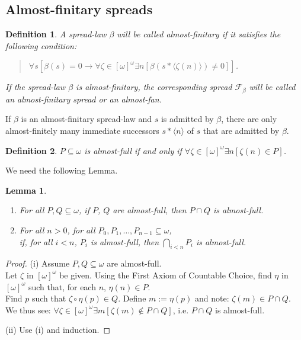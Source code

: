 \documentclass[a4paper]{amsart}
\theoremstyle{plain}
\newtheorem{lemma}[theorem]{Lemma}
\newtheorem{definition}{Definition}
\begin{document}
 \subsection{Almost-finitary spreads}\label{SS:afspreads}
\begin{definition}\label{D:almostfan}
 A spread-law $\beta$ will be called \emph{almost-finitary} if it satisfies the following condition: \begin{quote} $\forall s[\beta(s)=0\rightarrow \forall \zeta\in[\omega]^\omega\exists n[\beta(s\ast\langle \zeta(n) \rangle)\neq 0]]$. \end{quote}
 
If the spread-law $\beta$ is almost-finitary, the corresponding spread $\mathcal{F}_\beta$ will be called an \emph{ almost-finitary spread} or an \emph{ almost-fan}. \end{definition}

If $\beta$ is an almost-finitary spread-law and $s$ is admitted by $\beta$, there are only almost-finitely many immediate successors $s\ast\langle n \rangle$ of $s$ that are admitted by $\beta$. 
\begin{definition} $P\subseteq \omega$ is \emph{almost-full} if and only if $\forall \zeta\in[\omega]^\omega \exists n[\zeta(n)\in P]$. \end{definition}
We need the following Lemma.

\begin{lemma}\label{L:almostfull} $\;$ \begin{enumerate}[\upshape (i)] \item For all $P,Q\subseteq \omega$, if $P$, $Q$ are almost-full, then $P\cap Q$ is almost-full. \item For all $n>0$, for all $P_0, P_1, \ldots, P_{n-1}\subseteq \omega$, \\if, for all $i<n$, $P_i$ is almost-full,  then $\bigcap_{i<n}P_i$ is almost-full. \end{enumerate} \end{lemma}
\begin{proof} (i) Assume $P,Q\subseteq \omega$ are almost-full. \\Let $\zeta$ in $[\omega]^\omega$ be given. Using the First Axiom of Countable Choice, find $\eta$ in $[\omega]^\omega$ such that, for each $n$, $\eta(n)\in P$. \\Find $p$ such that $\zeta\circ\eta(p)\in Q$. Define $m:=\eta(p)$ and note: $\zeta(m) \in P\cap Q$. \\We thus see: $\forall \zeta \in[\omega]^\omega\exists m[\zeta(m)\notin P\cap Q]$, i.e. $P\cap Q$ is almost-full. 

\smallskip (ii) Use (i) and induction. \end{proof}
\end{document}
